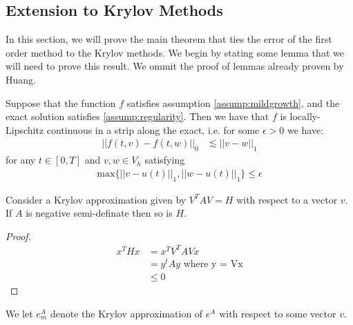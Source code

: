 \subsection{Extension to Krylov Methods}

In this section, we will prove the main theorem that ties the error of the first order method to the Krylov methods.
We begin by stating some lemma that we will need to prove this result.
We ommit the proof of lemmas already proven by Huang\cite{Huang2022}.

\begin{lemma}
    Suppose that the function $f$ satisfies assumption \ref{assump:mildgrowth}, and the exact solution satisfies \ref{assump:regularity}.
    Then we have that $f$ is locally-Lipschitz continuous in a strip along the exact, i.e. for some $\epsilon > 0$ we have:
    \begin{align*}
        ||f(t,v) - f(t,w)||_0 &\lesssim ||v-w||_1
    \end{align*}
    for any $t\in [0,T]$ and $v,w \in V_h$ satisfying
    \begin{align*}
        \text{max}\{||v-u(t)||_1,||w-u(t)||_1\}\leq \epsilon
    \end{align*}
\end{lemma}

\begin{lemma}
    Consider a Krylov approximation given by $V^TAV = H$ with respect to a vector $v$.
    If $A$ is negative semi-definate then so is $H$.
\end{lemma}
\begin{proof}
    \begin{align*}
        x^T Hx &= x^T V^TAVx\\
        &= y^tAy \text{ where y = Vx}\\
        &\leq 0
    \end{align*}
\end{proof}

\begin{definition}
    We let $e_m^A$ denote the Krylov approximation of $e^A$ with respect to some vector $v$.
\end{definition}

